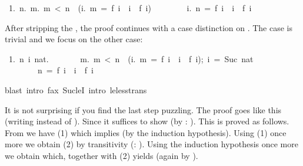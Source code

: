 \begin{isabellebody}
\begin{isamarkuptxt}
\begin{isabelle}
\ 1.\ {\isasymAnd}\mbox{n}.\ {\isasymforall}\mbox{m}.\ \mbox{m}\ <\ \mbox{n}\ {\isasymlongrightarrow}\ ({\isasymforall}\mbox{i}.\ \mbox{m}\ =\ f\ \mbox{i}\ {\isasymlongrightarrow}\ \mbox{i}\ {\isasymle}\ f\ \mbox{i})\isanewline
\ \ \ \ \ \ \ {\isasymLongrightarrow}\ {\isasymforall}\mbox{i}.\ \mbox{n}\ =\ f\ \mbox{i}\ {\isasymlongrightarrow}\ \mbox{i}\ {\isasymle}\ f\ \mbox{i}
\end{isabelle}
After stripping the , the proof continues with a case
distinction on . The case  is trivial and we focus on
the other case:
\begin{isabelle}
\ 1.\ {\isasymAnd}\mbox{n}\ \mbox{i}\ \mbox{nat}.\isanewline
\ \ \ \ \ \ \ {\isasymlbrakk}{\isasymforall}\mbox{m}.\ \mbox{m}\ <\ \mbox{n}\ {\isasymlongrightarrow}\ ({\isasymforall}\mbox{i}.\ \mbox{m}\ =\ f\ \mbox{i}\ {\isasymlongrightarrow}\ \mbox{i}\ {\isasymle}\ f\ \mbox{i});\ \mbox{i}\ =\ Suc\ \mbox{nat}{\isasymrbrakk}\isanewline
\ \ \ \ \ \ \ {\isasymLongrightarrow}\ \mbox{n}\ =\ f\ \mbox{i}\ {\isasymlongrightarrow}\ \mbox{i}\ {\isasymle}\ f\ \mbox{i}
\end{isabelle}%
\end{isamarkuptxt}%
blast\ intro{\isacharbang}{\isacharcolon}\ f{\isacharunderscore}ax\ Suc{\isacharunderscore}leI\ intro{\isacharcolon}\ le{\isacharunderscore}less{\isacharunderscore}trans{\isacharparenright}%
\begin{isamarkuptext}%
\noindent
It is not surprising if you find the last step puzzling.
The proof goes like this (writing  instead of ).
Since  it suffices to show
 (by : ). This is
proved as follows. From  we have 
(1) which implies  (by the induction hypothesis).
Using (1) once more we obtain  (2) by transitivity
(: ).
Using the induction hypothesis once more we obtain 
which, together with (2) yields  (again by
).


\end{isamarkuptext}
\end{isabellebody}
